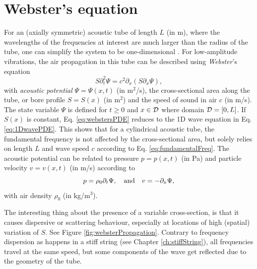\section{Webster's equation}\label{sec:webstersEq}
For an (axially symmetric) acoustic tube of length $L$ (in m), where the wavelengths of the frequencies at interest are much larger than the radius of the tube, one can simplify the system to be one-dimensional \cite{Bilbao2018}. For low-amplitude vibrations, the air propagation in this tube can be described using \textit{Webster}'s equation \cite{Webster1919}
\begin{equation}\label{eq:webstersPDE}
    S\partial_t^2\Psi = c^2\partial_x(S\partial_x\Psi),
\end{equation}
with \textit{acoustic potential} $\Psi = \Psi(x,t)$ (in m$^2$/s), the cross-sectional area along the tube, or bore profile $S = S(x)$ (in m$^2$) and the speed of sound in air $c$ (in m/s). The state variable $\Psi$ is defined for $t\geq 0$ and $x \in \mathcal{D}$ where domain $\mathcal{D} = [0, L]$. If $S(x)$ is constant, Eq. \eqref{eq:webstersPDE} reduces to the 1D wave equation in Eq. \eqref{eq:1DwavePDE}. This shows that for a cylindrical acoustic tube, the fundamental frequency is not affected by the cross-sectional area, but solely relies on length $L$ and wave speed $c$ according to Eq. \eqref{eq:fundamentalFreq}. The acoustic potential can be related to pressure $p = p(x,t)$ (in Pa) and particle velocity $v = v(x,t)$ (in m/s) according to \cite{Bilbao2018}
\begin{equation}\label{eq:pressureVelocityWebster}
    p = \rho_0 \partial_t \Psi, \quad \text{and} \quad v = -\partial_x \Psi,
\end{equation}
with air density $\rho_0$ (in kg/m$^3$).

The interesting thing about the presence of a variable cross-section, is that it causes dispersive or scattering behaviour, especially at locations of high (spatial) variation of $S$. See Figure \ref{fig:websterPropagation}. Contrary to frequency dispersion as happens in a stiff string (see Chapter \ref{ch:stiffString}), all frequencies travel at the same speed, but some components of the wave get reflected due to the geometry of the tube.

